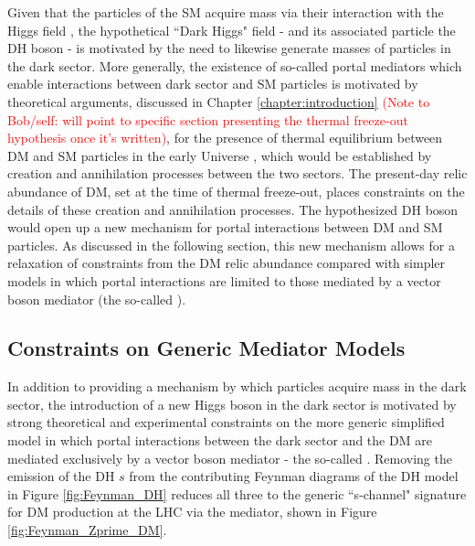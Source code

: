 Given that the particles of the SM acquire mass via their interaction with the Higgs field \cite{HiggsTheory1,HiggsTheory2,HiggsTheory3}, the hypothetical ``Dark Higgs" field - and its associated particle the DH boson - is motivated by the need to likewise generate masses of particles in the dark sector. More generally, the existence of so-called portal mediators which enable interactions between dark sector and SM particles is motivated by theoretical arguments, discussed in Chapter \ref{chapter:introduction} \textcolor{red}{(Note to Bob/self: will point to specific section presenting the thermal freeze-out hypothesis once it's written)}, for the presence of thermal equilibrium between DM and SM particles in the early Universe \cite{DM_earlyUniverse}, which would be established by creation and annihilation processes between the two sectors. The present-day relic abundance of DM, set at the time of thermal freeze-out, places constraints on the details of these creation and annihilation processes. The hypothesized DH boson would open up a new mechanism for portal interactions between DM and SM particles. As discussed in the following section, this new mechanism allows for a relaxation of constraints from the DM relic abundance compared with simpler models in which portal interactions are limited to those mediated by a vector boson mediator (the so-called \Zprime). 

\subsection{Constraints on Generic \Zprime Mediator Models} 
\label{sec:Zprime_model_constraints}

In addition to providing a mechanism by which particles acquire mass in the dark sector, the introduction of a new Higgs boson in the dark sector is motivated by strong theoretical and experimental constraints \cite{Zprime_portal_gen, Zprime_portal_LHC} on the more generic simplified model in which portal interactions between the dark sector and the DM are mediated exclusively by a  vector boson mediator - the so-called \Zprime. Removing the emission of the DH \(s\) from the contributing Feynman diagrams of the DH model in Figure \ref{fig:Feynman_DH} reduces all three to the generic ``s-channel" signature for DM production at the LHC via the \Zprime mediator, shown in Figure \ref{fig:Feynman_Zprime_DM}. 

